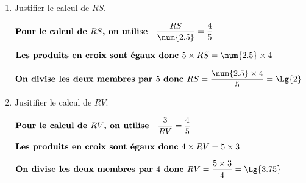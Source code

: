     \begin{enumerate}
        \item Justifier le calcul de $RS$.

        {\color{red}
        $\mbox{\bf Pour le calcul de $RS$, on utilise} \quad \dfrac{RS}{\num{2.5}}=\dfrac{4}{5}$

        $\mbox{\bf Les produits en croix sont égaux donc }5\times RS=\num{2.5}\times4$

        $\mbox{\bf On divise les deux membres par $5$ donc }RS=\dfrac{\num{2.5}\times4}{5}=\Lg{2}$
        }
        \item Jusitifier le calcul de $RV$.

        {\color{red}
        $\mbox{\bf Pour le calcul de $RV$, on utilise} \quad \dfrac{3}{RV}=\dfrac{4}{5}$

        $\mbox{\bf Les produits en croix sont égaux donc }4\times RV=5\times3$

        $\mbox{\bf On divise les deux membres par $4$ donc }RV=\dfrac{5\times3}{4}=\Lg{3.75}$
        }
    \end{enumerate}
